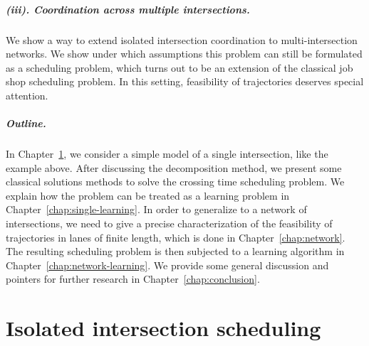 \documentclass[a4paper]{report}
\theoremstyle{definition}
\theoremstyle{plain}
\begin{document}
\paragraph{(iii). Coordination across multiple intersections.}
We show a way to extend isolated intersection coordination to multi-intersection
networks. We show under which assumptions this problem can still be formulated
as a scheduling problem, which turns out to be an extension of the classical job
shop scheduling problem.
%
In this setting, feasibility of trajectories deserves special attention.

\paragraph{Outline.}

In Chapter~\ref{chap:single}, we consider a simple model of a single
intersection, like the example above. After discussing the decomposition method,
we present some classical solutions methods to solve the crossing time
scheduling problem.
%
We explain how the problem can be treated as a learning problem in
Chapter~\ref{chap:single-learning}.
%
In order to generalize to a network of intersections, we need to give a precise
characterization of the feasibility of trajectories in lanes of finite length,
which is done in Chapter~\ref{chap:network}.
%
The resulting scheduling problem is then subjected to a learning algorithm in
Chapter~\ref{chap:network-learning}.
%
We provide some general discussion and pointers for further research in
Chapter~\ref{chap:conclusion}.





\chapter{Isolated intersection scheduling}\label{chap:single}

\end{document}
